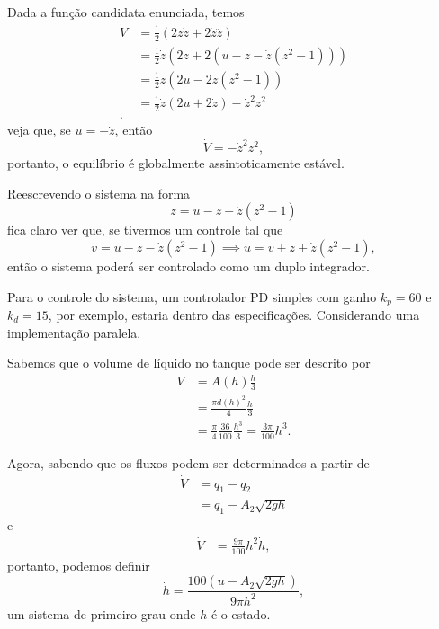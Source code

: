 \documentclass[a4paper]{report}
\begin{document}


Dada a função candidata enunciada, temos 
\begin{align*}
    \dot{V} &= \frac{1}{2}\left( 2z\dot{z} + 2\dot{z}\ddot{z} \right) \\
	    &= \frac{1}{2}\dot{z} \left( 2z + 2\left( u -z -\dot{z}\left( z^2 -1 \right)  \right)  \right) \\
	    &= \frac{1}{2}\dot{z} \left(  2u -2\dot{z}\left( z^2 -1 \right)  \right) \\
	    &= \frac{1}{2}\dot{z} \left(  2u +2\dot{z}\right) - \dot{z}^2z^2 \\
.\end{align*}
veja que, se $u = -\dot{z}$, então \[
\dot{V} = -\dot{z}^2z^2
,\] portanto, o equilíbrio é globalmente assintoticamente estável.


Reescrevendo o sistema na forma \[
\ddot{z} = u -z -\dot{z}\left( z^2 -1 \right)
\] fica claro ver que, se tivermos um controle tal que \[
v = u -z -\dot{z}\left( z^2 -1 \right) \implies u = v +z +\dot{z}\left( z^2 -1 \right)
,\] então o sistema poderá ser controlado como um duplo integrador.

Para o controle do sistema, um controlador PD simples com ganho $k_p = 60$ e $k_d = 15$, por exemplo, estaria dentro das especificações. Considerando uma implementação paralela.


Sabemos que o volume de líquido no tanque pode ser descrito por
\begin{align*}
    V &= A(h) \frac{h}{3} \\
      &= \frac{\pi d(h)^2}{4}\frac{h}{3} \\
      &= \frac{\pi}{4}\frac{36}{100}\frac{h^3}{3} = \frac{3\pi}{100}h^3
.\end{align*}

Agora, sabendo que os fluxos podem ser determinados a partir de
\begin{align*}
    \dot{V} &= q_1-q_2 \\
	    &= q_1 - A_2\sqrt{2gh} 
\end{align*}
e
\begin{align*}
    \dot{V} &= \frac{9\pi}{100}h^2 \dot{h}
,\end{align*}
portanto, podemos definir \[
    \dot{h} = \frac{100\left( u - A_2\sqrt{2gh}  \right) }{9\pi h^2}
,\] um sistema de primeiro grau onde $h$ é o estado.
\end{document}
